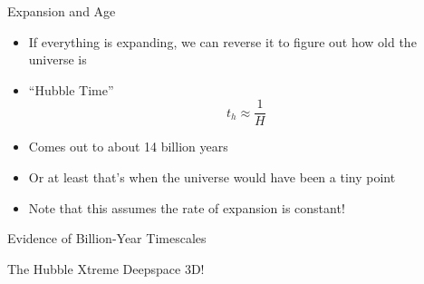 \documentclass[pdf, aspectratio=169]{beamer}
\begin{document}
\begin{frame}{Expansion and Age}
  \begin{itemize}
	\item If everything is expanding, we can reverse it to figure out how old the universe is
	\item ``Hubble Time''
	  \[t_h \approx \frac{1}{H}\]
	\item Comes out to about 14 billion years
	\item Or at least that's when the universe would have been a tiny point
	\item Note that this assumes the rate of expansion is constant!
  \end{itemize}
\end{frame}

\begin{frame}{Evidence of Billion-Year Timescales}
  \begin{center}
  \end{center}
\end{frame}

\begin{frame}{The Hubble Xtreme Deepspace 3D!}
  \begin{center}
  \end{center}
\end{frame}


\end{document}
